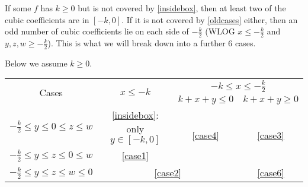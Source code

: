 \documentclass[11pt]{scrartcl}
\begin{document}
If some $f$ has $k \ge 0$ but is not covered by \ref{insidebox}, then at least two of the cubic coefficients are in $[-k, 0]$. 
If it is not covered by \ref{oldcases} either, then an odd number of cubic coefficients lie on each side of $-\frac{k}{2}$
(WLOG $x \le -\frac{k}{2}$ and $y, z, w \ge -\frac{k}{2}$). This is what we will break down into a further $6$ cases.

Below we assume $k \ge 0$.
\begin{table}[h!]
	\centering
	\begin{tabular}{|c|c|c|c|}
	\hline
	\multirow{2}{*}{Cases} &\multirow{2}{*}{$x \le -k$} &  \multicolumn{2}{c|}{$-k \le x \le -\frac{k}{2}$} \\\cline{3-4}
	
	& & $k + x + y \le 0$& $k + x + y \ge 0$ \\
		\hline 
		$ -\frac{k}{2} \le y \le 0 \le z \le w$ & \ref{insidebox}: only $y \in [-k,0]$ &  \multirow{2}{*}{\ref{case4}} & 
		 \multirow{2}{*}{\ref{case3}}\\\cline{1-2}
		$ -\frac{k}{2} \le y \le z \le 0 \le w$ &  \ref{case1}& &  \\
		\hline 
		$ -\frac{k}{2} \le y \le z \le w \le 0$ & \multicolumn{2}{c|}{\ref{case2}}  & \ref{case6} \\
		\hline
	\end{tabular}
\end{table}
\end{document}
